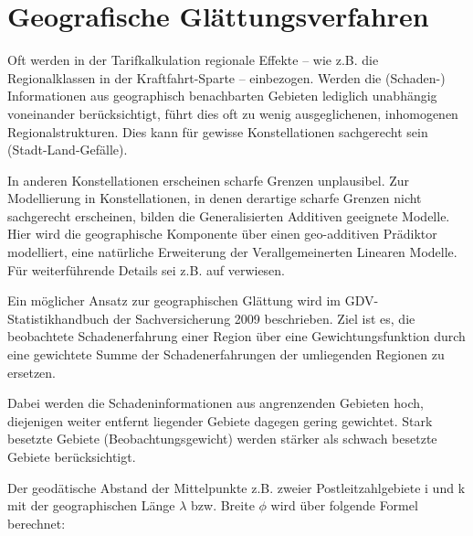 





\section{Geografische Glättungsverfahren} \label{Geografische_Glaettungsverfahren}%

Oft werden in der Tarifkalkulation regionale Effekte – wie z.B. die Regionalklassen in der Kraftfahrt-Sparte – einbezogen. Werden die (Schaden-) Informationen aus geographisch benachbarten Gebieten lediglich unabhängig voneinander berücksichtigt, führt dies oft zu wenig ausgeglichenen, inhomogenen Regionalstrukturen. Dies kann für gewisse Konstellationen sachgerecht sein (Stadt-Land-Gefälle). 

In anderen Konstellationen erscheinen scharfe Grenzen unplausibel. Zur Modellierung in Konstellationen, in denen derartige scharfe Grenzen nicht sachgerecht erscheinen, bilden die Generalisierten Additiven geeignete Modelle. Hier wird die geographische Komponente über einen geo-additiven Prädiktor modelliert, eine natürliche Erweiterung der Verallgemeinerten Linearen Modelle. Für weiterführende Details sei z.B. auf \cite{Fahrmeir} verwiesen.

Ein möglicher Ansatz zur geographischen Glättung wird im GDV-Statistikhandbuch der Sachversicherung 2009 \cite{Statistikhandbuch} beschrieben. Ziel ist es, die beobachtete Schadenerfahrung einer Region über eine Gewichtungsfunktion durch eine gewichtete Summe der Schadenerfahrungen der umliegenden Regionen zu ersetzen. 

Dabei werden die Schadeninformationen aus angrenzenden Gebieten hoch, diejenigen weiter entfernt liegender Gebiete dagegen gering gewichtet. Stark besetzte Gebiete (Beobachtungsgewicht) werden stärker als schwach besetzte Gebiete berücksichtigt.

Der geodätische Abstand der Mittelpunkte z.B. zweier Postleitzahlgebiete i und k mit der geographischen Länge $\lambda$   bzw. Breite $\phi$  wird über folgende Formel berechnet: 

